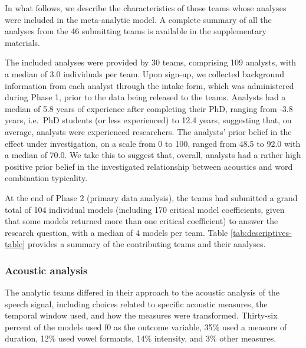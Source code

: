\documentclass[Review,times,sageh]{sagej}
\begin{document}
In what follows, we describe the characteristics of those teams whose analyses were included in the meta-analytic model.
A complete summary of all the analyses from the 46 submitting teams is available in the supplementary materials.

The included analyses were provided by 30 teams, comprising 109 analysts, with a median of 3.0 individuals per team.
Upon sign-up, we collected background information from each analyst through the intake form, which was administered during Phase 1, prior to the data being released to the teams.
Analysts had a median of 5.8 years of experience after completing their PhD, ranging from -3.8 years, i.e.~PhD students (or less experienced) to 12.4 years, suggesting that, on average, analysts were experienced researchers.
The analysts' prior belief in the effect under investigation, on a scale from 0 to 100, ranged from 48.5 to 92.0 with a median of 70.0.
We take this to suggest that, overall, analysts had a rather high positive prior belief in the investigated relationship between acoustics and word combination typicality.

At the end of Phase 2 (primary data analysis), the teams had submitted a grand total of 104 individual models (including 170 critical model coefficients, given that some models returned more than one critical coefficient) to answer the research question, with a median of 4 models per team.
Table \ref{tab:descriptives-table} provides a summary of the contributing teams and their analyses.

\hypertarget{acoustic-analysis}{%
\subsubsection{Acoustic analysis}\label{acoustic-analysis}}

The analytic teams differed in their approach to the acoustic analysis of the speech signal, including choices related to specific acoustic measures, the temporal window used, and how the measures were transformed.
Thirty-six percent of the models used f0 as the outcome variable, 35\% used a measure of duration, 12\% used vowel formants, 14\% intensity, and 3\% other measures.
\end{document}
